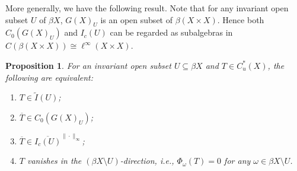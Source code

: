\documentclass[12pt, a4paper]{amsart}
\numberwithin{equation}{section}
\newtheorem{prop}[thm]{Proposition}
\theoremstyle{definition}
\theoremstyle{remark}
\begin{document}
More generally, we have the following result. Note that for any invariant open subset $U$ of $\beta X$, $G(X)_U$ is an open subset of $\beta(X \times X)$. Hence both $C_0(G(X)_U)$ and $I_c(U)$ can be regarded as subalgebras in $C(\beta(X \times X)) \cong \ell^\infty(X \times X)$.

\begin{prop}\label{prop: geometric char for ghostly ideals}
For an invariant open subset $U \subseteq \beta X$ and $T \in C^*_u(X)$, the following are equivalent:
\begin{enumerate}
 \item $T \in \tilde{I}(U)$;
 \item $\overline{T} \in C_0(G(X)_U)$;
 \item $\overline{T} \in \overline{I_c(U)}^{\|\cdot\|_\infty}$;
 \item $T$ vanishes in the $(\beta X \setminus U)$-direction, \emph{i.e.}, $\Phi_\omega(T) = 0$ for any $\omega \in \beta X \setminus U$.
\end{enumerate}
\end{prop}
\end{document}
